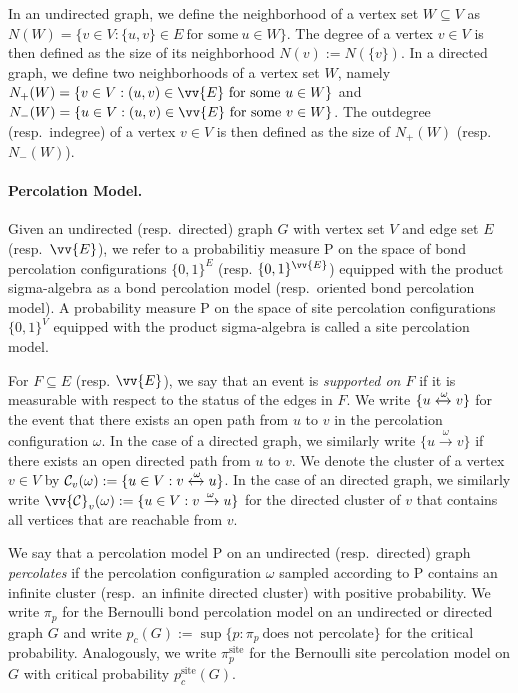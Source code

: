 \documentclass[11pt]{article}
\theoremstyle{remark}
\begin{document}
In an undirected graph, we define the neighborhood of a vertex set $W\subseteq V$ as $N(W)=\{v \in V: \{u,v\} \in E\ \text{for some}\ u \in W\}$. The degree of a vertex $v \in V$ is then defined as the size of its neighborhood $N(v):= N(\{v\})$.  In a directed graph, we define two neighborhoods of a vertex set $W$, namely $N_+(W)=\{v \in V: (u,v) \in \vv{E}\ \text{for some}\ u \in W\}$ and  $N_-(W)=\{u \in V: (u,v) \in \vv{E}\ \text{for some}\ v \in W\}$. The outdegree (resp.\ indegree) of a vertex $v \in V$ is then defined as the size of $N_+(W)$ (resp.\ $N_-(W)$).


\paragraph{Percolation Model.} Given an undirected (resp.\ directed) graph $G$ with vertex set $V$ and edge set $E$ (resp.\ $\vv{E}$), we refer to a probabilitiy measure $\mathrm{P}$ on the space of bond percolation configurations $\{0,1\}^E$ (resp. $\{0,1\}^{\vv{E}}$) equipped with the product sigma-algebra as a bond percolation model (resp.\ oriented bond percolation model). A probability measure $\mathrm{P}$ on the space of site percolation configurations $\{0,1\}^V$ equipped with the product sigma-algebra is called a site percolation model. 

For $F \subseteq E$ (resp. $\vv{E}$), we say that an event is \emph{supported on $F$} if it is measurable with respect to the status of the edges in $F$. 
We write $\{u \xleftrightarrow{\omega} v\}$ for the event that there exists an open path from $u$ to $v$ in the percolation configuration $\omega$. In the case of a directed graph, we similarly write $\{u \xrightarrow{\omega} v\}$ if there exists an open directed path from $u$ to $v$.
We denote the cluster of a vertex $v \in V$ by $\mathcal{C}_v(\omega) := \{u \in V : v \xleftrightarrow{\omega} u\}$. In the case of an directed graph, we similarly write $\vv{\mathcal{C}}_v(\omega) := \{u \in V : v \xrightarrow{\omega} u\}$ for the directed cluster of $v$ that contains all vertices that are reachable from $v$. 

We say that a percolation model $\mathrm{P}$ on an undirected (resp.\ directed) graph \emph{percolates} if the percolation configuration $\omega$ sampled according to $\mathrm{P}$ contains an infinite cluster (resp.\ an infinite directed cluster) with positive probability. We write $\pi_p$ for the Bernoulli bond percolation model on an undirected or directed graph $G$ and write $p_c(G):= \sup\{p : \pi_p\ \text{does not percolate}\}$ for the critical probability. Analogously, we write $\pi_p^{\mathrm{site}}$ for the Bernoulli site percolation model on $G$ with critical probability $p_c^{\mathrm{site}}(G)$.
\end{document}
